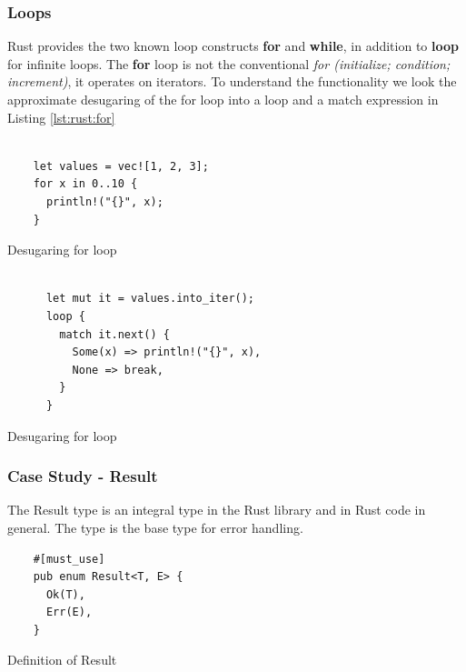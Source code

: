 \subsubsection{Loops}

Rust provides the two known loop constructs \textbf{for} and \textbf{while}, in addition to \textbf{loop} for infinite loops.
The \textbf{for} loop is not the conventional \textit{for (initialize; condition; increment)}, it operates on iterators.
To understand the functionality we look the approximate desugaring of the for loop into a loop and a match expression in Listing \ref{lst:rust:for}


\begin{minipage}[b]{0.5\linewidth}
  \begin{listing}[H]
  \begin{verbatim}

    let values = vec![1, 2, 3];
    for x in 0..10 {
      println!("{}", x);
    }

  \end{verbatim}
  \caption{Desugaring for loop}
  \label{lst:rust:for}
  \end{listing}
  \end{minipage}

\begin{minipage}[b]{0.5\linewidth}
  \begin{listing}[H]
    \begin{verbatim}

      let mut it = values.into_iter();
      loop {
        match it.next() {
          Some(x) => println!("{}", x),
          None => break,
        }
      }

    \end{verbatim}

    \caption{Desugaring for loop}
    \label{lst:rust:desugared-for}
  \end{listing}
\end{minipage}

\subsubsection{Case Study - Result}

The Result type is an integral type in the Rust library and in Rust code in general.
The type is the base type for error handling.

\begin{listing}[H]
  \begin{verbatim}
    #[must_use]
    pub enum Result<T, E> {
      Ok(T),
      Err(E),
    }
\end{verbatim}
\caption{Definition of Result}
\label{lst:rust:result}
\end{listing}

